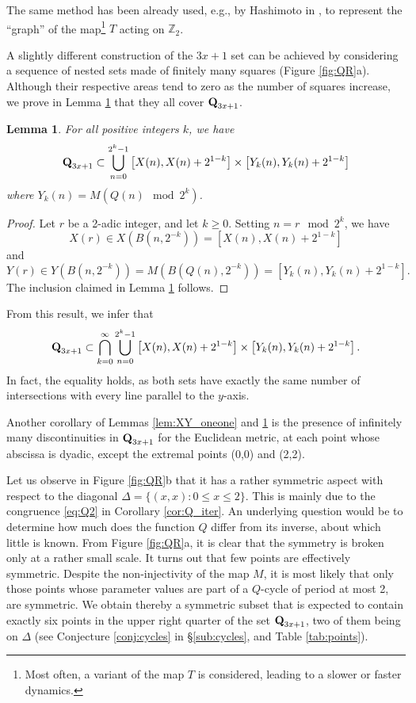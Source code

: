 \documentclass[12pt]{article}
\newtheorem{lemma}{Lemma}
\theoremstyle{definition}
\newcommand{\Qset}{\normalfont \textbf{Q}_{3x+1}}
\begin{document}
{{The same method  has been already used, e.g., by Hashimoto in \cite{Has07}, to represent the ``graph'' of the map\footnote{Most often, a variant of the map $T$ is considered, leading to a slower or faster dynamics.}  $T$ acting on $\mathbb Z_2$. 

A slightly different construction of the $3x+1$ set can be achieved by considering a sequence of nested sets made of finitely many squares  (Figure \ref{fig:QR}a). Although their respective areas tend to zero as the number of squares increase, we prove in Lemma \ref{lem:Qset_boxes} that they all cover $\Qset$.
\begin{lemma} \label{lem:Qset_boxes}
For all positive integers $k$, we have
$$ \Qset \subset \bigcup_{n=0}^{2^{k}-1} \left[ X(n), X(n) + 2^{1-k} \right] \times  \left[ Y_k(n), Y_k(n) + 2^{1-k} \right]$$
where $Y_k(n) = M\left( Q(n) \mod 2^k \right)$.
\end{lemma}

\begin{proof}
Let $r$ be a 2-adic integer, and let $k \geq 0$. Setting $n=r \mod 2^k$, we have
$$ X(r) \in X\left( B(n,2^{-k})\right)  = \left[ X(n), X(n) + 2^{1-k} \right]$$
and
$$ Y(r) \in Y\left( B(n,2^{-k})\right)  = M\left( B(Q(n),2^{-k})\right) 
= \left[ Y_k(n), Y_k(n) + 2^{1-k} \right].$$
The inclusion claimed in Lemma \ref{lem:Qset_boxes} follows. 
\end{proof}

From this result, we infer that
\begin{equation}
\Qset \subset \bigcap_{k=0}^{\infty} \bigcup_{n=0}^{2^{k}-1} \left[ X(n), X(n) + 2^{1-k} \right] \times  \left[ Y_k(n), Y_k(n) + 2^{1-k} \right].
\end{equation}
In fact, the equality holds, as both sets have exactly the same number of intersections with every line parallel to the $y$-axis.

Another corollary of Lemmas \ref{lem:XY_oneone} and \ref{lem:Qset_boxes} is the presence of infinitely many discontinuities in $\Qset$ for the Euclidean metric, at each point whose abscissa is dyadic, except the extremal points (0,0) and (2,2).
 
 Let us observe in Figure \ref{fig:QR}b that it has a rather symmetric aspect with respect to the diagonal $\Delta = \lbrace(x,x) : 0 \leq x \leq 2\rbrace$. This is mainly due to the congruence \eqref{eq:Q2} in Corollary \ref{cor:Q_iter}. An underlying question would be to determine how much does the function $Q$ differ from its inverse, about which little is known. From Figure \ref{fig:QR}a, it is clear that the symmetry is broken only at a rather small scale. It turns out that few points are effectively symmetric. Despite the non-injectivity of the map $M$, it is most likely that only those points whose parameter values are part of a $Q$-cycle of period at most 2, are symmetric. We obtain thereby  a symmetric subset that is expected to contain exactly six points in the  upper right quarter of the set $\Qset$, two of them being on $\Delta$ (see Conjecture \ref{conj:cycles} in \S\ref{sub:cycles}, and Table \ref{tab:points}).

}}
\end{document}
